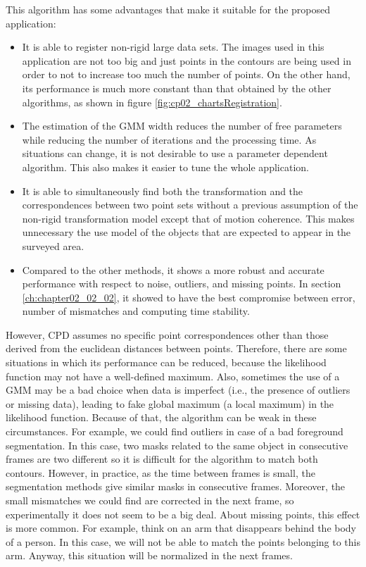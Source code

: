 \begin{itemize}
 This algorithm has some advantages that make it suitable for the proposed application:
 \begin{itemize}
  \item It is able to register non-rigid large data sets. The images used in this application are not too big and just 
points in the contours are being used in order to not to increase too much the number of points. On the other hand, its 
performance is much more constant than that obtained by the other algorithms, as shown in figure 
\ref{fig:cp02_chartsRegistration}.
  \item The estimation of the \ac{GMM} width reduces the number of free parameters while reducing the number of iterations and the processing time. As situations can change, it is not desirable to use a parameter dependent algorithm. This also makes it easier to tune the whole application.
  \item It is able to simultaneously find both the transformation and the correspondences between two point sets without a previous assumption of the non-rigid transformation model except that of motion coherence. This makes unnecessary the use model of the objects that are expected to appear in the surveyed area.
  \item Compared to the other methods, it shows a more robust and accurate performance with respect to noise, outliers, 
and missing points. In section \ref{ch:chapter02_02_02}, it showed to have the best compromise between error, 
number of mismatches and computing time stability.
 \end{itemize}
 However, \ac{CPD} assumes no specific point correspondences other than those derived from the euclidean distances between 
points. Therefore, there are some situations in which its performance can be reduced, because the likelihood function may 
not have a well-defined maximum. Also, sometimes the use of a \ac{GMM} may be a bad choice when  
data is imperfect (i.e., the presence of outliers or missing data), leading to fake global maximum (a local maximum) in the likelihood function. Because of that, the 
algorithm can be weak in these circumstances. For example, we could find outliers in case of a bad foreground segmentation. In this case, two masks related to the same object in consecutive frames are two different so it is difficult for the algorithm to match both contours. However, in practice, as the time between frames is small, the segmentation methods give similar masks in consecutive frames. Moreover, the small mismatches we could find are corrected in the next frame, so experimentally it does not seem to be a big deal. About missing points, this effect is more common. For example, think on an arm that disappears behind the body of a person. In this case, we will not be able to match the points belonging to this arm. Anyway, this situation will be normalized in the next frames.


\end{itemize}
